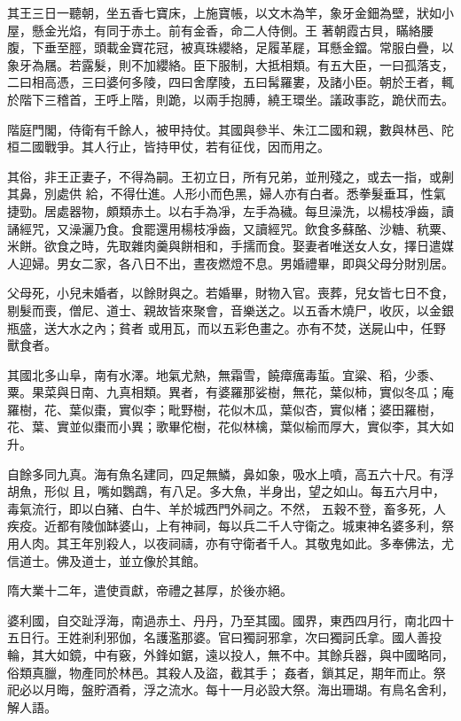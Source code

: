 \begin{pinyinscope}
 其王三日一聽朝，坐五香七寶床，上施寶帳，以文木為竿，象牙金鈿為壁，狀如小屋，懸金光焰，有同于赤土。前有金香，命二人侍側。王
 著朝霞古貝，瞞絡腰腹，下垂至脛，頭載金寶花冠，被真珠纓絡，足履革屣，耳懸金鐺。常服白疊，以象牙為屩。若露髮，則不加纓絡。臣下服制，大抵相類。有五大臣，一曰孤落支，二曰相高憑，三曰婆何多陵，四曰舍摩陵，五曰髯羅婁，及諸小臣。朝於王者，輒於階下三稽首，王呼上階，則跪，以兩手抱膊，繞王環坐。議政事訖，跪伏而去。



 階庭門閣，侍衛有千餘人，被甲持仗。其國與參半、朱江二國和親，數與林邑、陀桓二國戰爭。其人行止，皆持甲仗，若有征伐，因而用之。



 其俗，非王正妻子，不得為嗣。王初立日，所有兄弟，並刑殘之，或去一指，或劓其鼻，別處供
 給，不得仕進。人形小而色黑，婦人亦有白者。悉拳髮垂耳，性氣捷勁。居處器物，頗類赤土。以右手為凈，左手為穢。每旦澡洗，以楊枝凈齒，讀誦經咒，又澡灑乃食。食罷還用楊枝凈齒，又讀經咒。飲食多蘇酪、沙糖、秔粟、米餅。欲食之時，先取雜肉羹與餅相和，手擩而食。娶妻者唯送女人女，擇日遣媒人迎婦。男女二家，各八日不出，晝夜燃燈不息。男婚禮畢，即與父母分財別居。



 父母死，小兒未婚者，以餘財與之。若婚畢，財物入官。喪葬，兒女皆七日不食，剔髮而喪，僧尼、道士、親故皆來聚會，音樂送之。以五香木燒尸，收灰，以金銀瓶盛，送大水之內；貧者
 或用瓦，而以五彩色畫之。亦有不焚，送屍山中，任野獸食者。



 其國北多山阜，南有水澤。地氣尤熱，無霜雪，饒瘴癘毒蜇。宜粱、稻，少黍、粟。果菜與日南、九真相類。異者，有婆羅那娑樹，無花，葉似柿，實似冬瓜；庵羅樹，花、葉似棗，實似李；毗野樹，花似木瓜，葉似杏，實似楮；婆田羅樹，花、葉、實並似棗而小異；歌畢佗樹，花似林檎，葉似榆而厚大，實似李，其大如升。



 自餘多同九真。海有魚名建同，四足無鱗，鼻如象，吸水上噴，高五六十尺。有浮胡魚，形似且，嘴如鸚鵡，有八足。多大魚，半身出，望之如山。每五六月中，毒氣流行，即以白豬、白牛、羊於城西門外祠之。不然，
 五穀不登，畜多死，人疾疫。近都有陵伽缽婆山，上有神祠，每以兵二千人守衛之。城東神名婆多利，祭用人肉。其王年別殺人，以夜祠禱，亦有守衛者千人。其敬鬼如此。多奉佛法，尤信道士。佛及道士，並立像於其館。



 隋大業十二年，遣使貢獻，帝禮之甚厚，於後亦絕。



 婆利國，自交趾浮海，南過赤土、丹丹，乃至其國。國界，東西四月行，南北四十五日行。王姓剎利邪伽，名護濫那婆。官曰獨訶邪拿，次曰獨訶氏拿。國人善投輪，其大如鏡，中有竅，外鋒如鋸，遠以投人，無不中。其餘兵器，與中國略同，俗類真臘，物產同於林邑。其殺人及盜，截其手；
 姦者，鎖其足，期年而止。祭祀必以月晦，盤貯酒肴，浮之流水。每十一月必設大祭。海出珊瑚。有鳥名舍利，解人語。




\end{pinyinscope}

